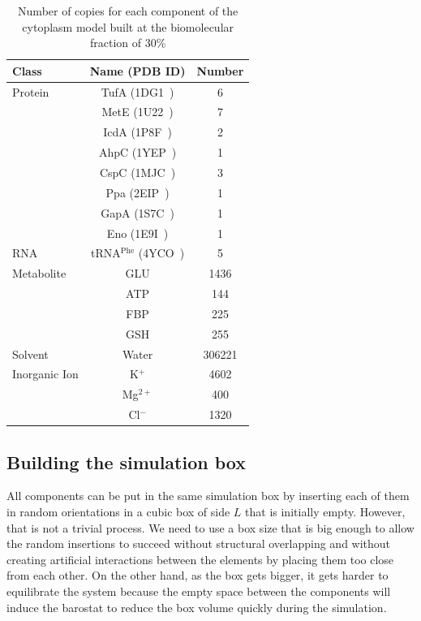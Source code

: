 \documentclass[journal=jacsat,manuscript=article]{achemso}
\begin{document}
\begin{table}
\centering
\begin{tabular}{lcc}
\hline
Class & Name (PDB ID) & Number\\
\hline
Protein & TufA (1DG1~\cite{Abel1996}) & 6\\
  & MetE (1U22~\cite{Ferrer2004}) & 7\\
  & IcdA (1P8F~\cite{Mesecar2000}) & 2\\
  & AhpC (1YEP~\cite{Parsonage2005}) & 1\\
  & CspC (1MJC~\cite{Schindelin1994}) & 3\\
  & Ppa (2EIP~\cite{Kankare1996}) & 1\\
  & GapA (1S7C~\cite{ShinXXX}) & 1\\
  & Eno (1E9I~\cite{Kuhnel2001}) & 1\\
\hline
RNA & tRNA$^{\text{Phe}}$ (4YCO~\cite{Byrne2015}) & 5\\
\hline
Metabolite & GLU & 1436\\
  & ATP & 144\\
  & FBP & 225\\
  & GSH & 255\\
\hline
Solvent & Water & 306221\\
\hline
Inorganic Ion & K$^{+}$ & 4602\\
  & Mg$^{2+}$ & 400\\
  & Cl$^{-}$ & 1320\\
\hline
\end{tabular}
\caption{Number of copies for each component of the cytoplasm model built at the biomolecular fraction of 30\%}
\label{tbl:soup_components}
\end{table}



\subsection{Building the simulation box}
All components can be put in the same simulation box by inserting each of them in random orientations in a cubic box of side $L$ that is initially empty. However, that is not a trivial process. We need to use a box size that is big enough to allow the random insertions to succeed without structural overlapping and without creating artificial interactions between the elements by placing them too close from each other. On the other hand, as the box gets bigger, it gets harder to equilibrate the system because the empty space between the components will induce the barostat to reduce the box volume quickly during the simulation.
\end{document}
